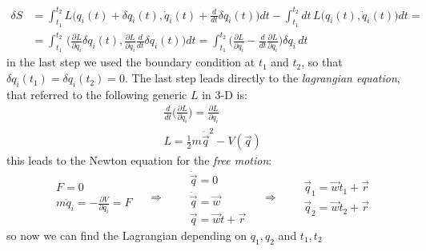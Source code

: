 \documentclass[class=article]{standalone}
\begin{document}
\begin{equation*}
\begin{split}
\delta S & = \int_{t_1}^{t_2} L \Big( q_i(t) + \delta q_i(t) ,  \dot q_i(t) + \frac{d}{dt} \delta q_i(t) \Big) dt -  \int_{t_1}^{t_2} dt \, L \Big( q_i(t),\dot q_i(t) \Big) dt = \\
& =  \int_{t_1}^{t_2} \, \Big(   \frac{\partial L}{\partial q_i} \delta q_i(t)    , \frac{\partial L}{\partial \dot q_i}  \frac{d}{dt} \delta q_i(t)    \Big)  dt
=  \int_{t_1}^{t_2} \Big(  \frac{\partial L}{\partial q_i}  - \frac{d}{dt}  \frac{\partial L}{\partial \dot q_i}   \Big) \delta q_i \, dt
\end{split}
\end{equation*}
in the last step we used the boundary condition at $t_1$ and $t_2$, so that $\delta q_i(t_1) = \delta q_i(t_2) = 0$.
The last step leads directly to the \emph{lagrangian equation}, that referred to the following generic $L$ in 3-D is:
\begin{equation*}
\begin{split}
& \frac{d}{dt} \Big( \frac{\partial L}{\partial \dot q_i} \Big) = \frac{\partial L}{\partial q_i} \\
& L = \frac{1}{2} m \dot\vec q^2 - V(\vec q)
\end{split}
\end{equation*}
this leads to the Newton equation for the \emph{free motion}:
\begin{equation*}
\begin{split}
& F = 0 \\ 
& m \ddot q_i = - \frac{\partial V}{\partial q_i }  = F
\end{split}\quad\Rightarrow\quad
\begin{split}
& \ddot \vec q = 0 \\
& \dot \vec q = \vec w \\
& \vec q = \vec w t + \vec r
\end{split}\quad\Rightarrow\quad
\begin{split}
& \vec q_1 = \vec w t_1 + \vec r \\
& \vec q_2 = \vec w t_2 + \vec r
\end{split}
\end{equation*}
so now we can find the Lagrangian depending on $q_1,q_2$ and $t_1,t_2$
\end{document}
